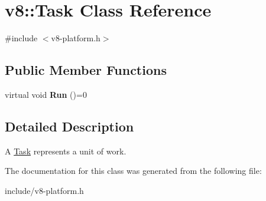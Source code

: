 \hypertarget{classv8_1_1_task}{}\section{v8\+:\+:Task Class Reference}
\label{classv8_1_1_task}


{\ttfamily \#include $<$v8-\/platform.\+h$>$}

\subsection*{Public Member Functions}
\begin{DoxyCompactItemize}
\item 
virtual void {\bfseries Run} ()=0\hypertarget{classv8_1_1_task_a6bd5bda0e357fcc2e727bf7b0170f99a}{}\label{classv8_1_1_task_a6bd5bda0e357fcc2e727bf7b0170f99a}

\end{DoxyCompactItemize}


\subsection{Detailed Description}
A \hyperlink{classv8_1_1_task}{Task} represents a unit of work. 

The documentation for this class was generated from the following file\+:\begin{DoxyCompactItemize}
\item 
include/v8-\/platform.\+h\end{DoxyCompactItemize}
